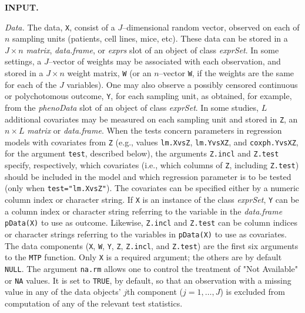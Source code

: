\documentclass[11pt]{article}
\newcommand{\Robject}[1]{\texttt{#1}}
\newcommand{\Rclass}[1]{\textit{#1}}
\begin{document}
\noindent
{\bf  INPUT.}
\begin{description}

\item{\em Data.} 
The data, \Robject{X}, consist of a $J$--dimensional random vector, observed on each of $n$ sampling units (patients, cell lines, mice, etc). 
These data can be stored in a $J \times n$ \Rclass{matrix}, \Rclass{data.frame}, or \Rclass{exprs} slot of an object of class \Rclass{exprSet}.
In some settings,  a $J$--vector of weights may be associated with each observation, and stored in a $J \times n$ weight matrix, \Robject{W} (or an $n$--vector \Robject{W}, if the weights are the same for each of the $J$ variables). 
One may also observe a possibly censored continuous or polychotomous outcome, \Robject{Y}, for each sampling unit, as obtained, for example, from the \Rclass{phenoData} slot of an object of class \Rclass{exprSet}. 
In some studies, $L$ additional covariates may be measured on each sampling unit and stored in \Robject{Z}, an $n \times L$ \Rclass{matrix} or \Rclass{data.frame}. 
When the tests concern parameters in regression models with covariates from \Robject{Z} (e.g., values \Robject{lm.XvsZ}, \Robject{lm.YvsXZ}, and \Robject{coxph.YvsXZ}, for the argument \Robject{test}, described below), the arguments \Robject{Z.incl} and \Robject{Z.test} specify, respectively, which covariates (i.e., which columns of \Robject{Z}, including \Robject{Z.test}) should be included in the model and which regression parameter is to be tested (only when \texttt{test="lm.XvsZ"}). 
The covariates can be specified either by a numeric column index or character string.
If \Robject{X} is an instance of the class \Rclass{exprSet}, \Robject{Y} can be a column index or character string referring to the variable in the \Rclass{data.frame} \Robject{pData(X)} to use as outcome. 
Likewise, \Robject{Z.incl} and \Robject{Z.test} can be column indices or character strings referring to the variables in \Robject{pData(X)} to use as covariates.
The data components (\Robject{X}, \Robject{W}, \Robject{Y}, \Robject{Z}, \Robject{Z.incl}, and \Robject{Z.test}) are the first six arguments to the \Robject{MTP} function. 
Only \Robject{X} is a required argument; the others are by default \Robject{NULL}.
The argument \Robject{na.rm} allows one to control the treatment of "Not Available" or \Robject{NA} values. It is set to \Robject{TRUE}, by default, so that an
observation with a missing value in any of the data objects' $j$th component ($j=1,\ldots,J$) is excluded from computation of any of the relevant test statistics.



\end{description}
\end{document}
